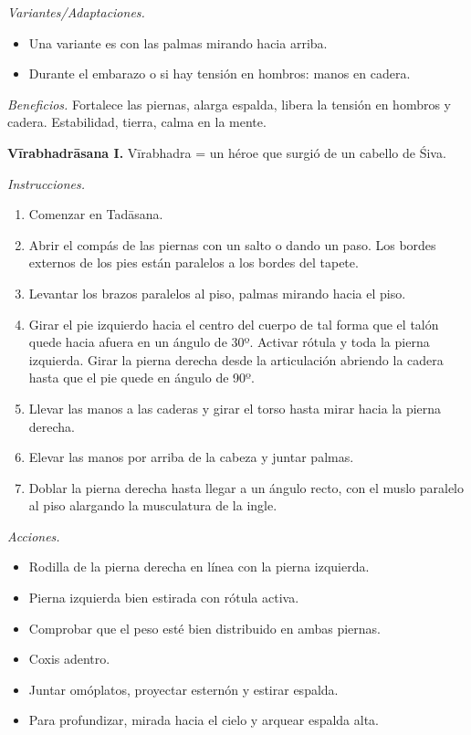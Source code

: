 \emph{Variantes/Adaptaciones.}
\begin{itemize}
\item Una variante es con las palmas mirando
hacia arriba.
\item Durante el embarazo o si hay tensión en
hombros: manos en cadera.
\end{itemize}

\emph{Beneficios.} Fortalece las piernas,
alarga espalda, libera la tensión en hombros
y cadera. Estabilidad, tierra, calma en la
mente.

\medskip\noindent\textbf{Vīrabhadrāsana I.}
Vīrabhadra = un héroe que surgió de un
cabello de Śiva.

\emph{Instrucciones.}
\begin{enumerate}
\item Comenzar en Tadāsana.
\item Abrir el compás de las piernas con un
salto o dando un paso. Los bordes externos de
los pies están paralelos a los bordes del
tapete.
\item Levantar los brazos paralelos al piso,
palmas mirando hacia el piso.
\item Girar el pie izquierdo hacia el centro
del cuerpo de tal forma que el talón quede
hacia afuera en un ángulo de 30º. Activar
rótula y toda la pierna izquierda. Girar la
pierna derecha desde la articulación abriendo
la cadera hasta que el pie quede en ángulo de
90º.
\item Llevar las manos a las caderas y girar
el torso hasta mirar hacia la pierna derecha.
\item Elevar las manos por arriba de la
cabeza y juntar palmas.
\item Doblar la pierna derecha hasta llegar a
un ángulo recto, con el muslo paralelo al
piso alargando la musculatura de la ingle.
\end{enumerate}

\emph{Acciones.}
\begin{itemize}
\item Rodilla de la pierna derecha en línea
con la pierna izquierda.
\item Pierna izquierda bien estirada con
rótula activa.
\item Comprobar que el peso esté bien
distribuido en ambas piernas.
\item Coxis adentro.
\item Juntar omóplatos, proyectar esternón y
estirar espalda.
\item Para profundizar, mirada hacia el cielo
y arquear espalda alta.
\end{itemize}

